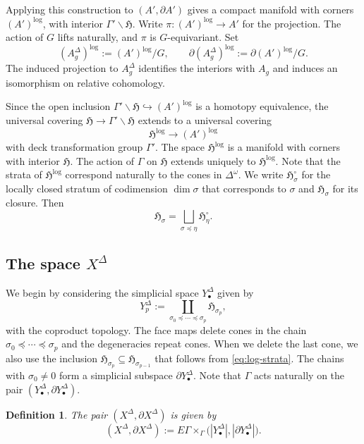 \documentclass[12 pt]{amsart}
\newcommand{\fH}{\mathfrak H}
\newcommand{\<}{\langle}
\renewcommand{\>}{\rangle}
\newtheorem{definition}[theorem]{Definition}
\theoremstyle{definition}
\begin{document}
Applying this construction to $(A',\partial A')$ gives a compact manifold with corners $(A')^{\log}$, with interior $\Gamma'\backslash\fH$. Write $\pi\colon(A')^{\log}\to A'$ for the projection. The action of $G$ lifts naturally, and $\pi$ is $G$-equivariant. Set
\[
(A_g^\Delta)^{\log}:=(A')^{\log}/G,
\qquad
\partial(A_g^\Delta)^{\log}:=\partial(A')^{\log}/G.
\]
The induced projection to $A_g^\Delta$ identifies the interiors with $A_g$ and induces an isomorphism on relative cohomology.

Since the open inclusion $\Gamma' \backslash \fH \hookrightarrow (A')^{\log}$ is a homotopy equivalence, the universal covering $\fH \to \Gamma' \backslash \fH$ extends to a universal covering
\[
\fH^{\log} \longrightarrow (A')^{\log}
\]
with deck transformation group $\Gamma'$. The space $\fH^{\log}$ is a manifold with corners with interior $\fH$. The action of $\Gamma$ on $\fH$ extends uniquely to $\fH^{\log}$.
Note that the strata of $\fH^{\log}$ correspond naturally to the cones in $\Delta^\omega$. We write $\fH_\sigma^\circ$ for the locally closed stratum of codimension $\dim \sigma$ that corresponds to $\sigma$ and $\fH_\sigma$ for its closure. Then 
\begin{equation} \label{eq:log-strata}
\fH_\sigma = \bigsqcup_{\sigma \preceq \eta} \fH_\eta^\circ.
\end{equation}

\subsection{The space \texorpdfstring{$X^\Delta$}{XDelta}}\label{sec:XgDelta}\label{sec:logarithmic-comparison}

We begin by considering the simplicial space $Y_\bullet^\Delta$ given by 
\[
Y_p^\Delta := \coprod_{\sigma_0 \preceq \cdots \preceq \sigma_p} \fH_{\sigma_p},
\]
with the coproduct topology. The face maps delete cones in the chain $\sigma_0 \preceq \cdots \preceq \sigma_p$ and the degeneracies repeat cones. When we delete the last cone, we also use the inclusion $\fH_{\sigma_p} \subseteq \fH_{\sigma_{p - 1}}$ that follows from \eqref{eq:log-strata}. The chains with $\sigma_0 \ne 0$ form a simplicial subspace $\partial Y_\bullet^\Delta$. Note that $\Gamma$ acts naturally on the pair $(Y_\bullet^\Delta, \partial Y_\bullet^\Delta)$.

\begin{definition}\label{def:XgDelta}
The pair $(X^\Delta, \partial X^\Delta)$ is given by
\[
(X^\Delta, \partial X^\Delta) := E \Gamma \times_\Gamma \bigl(|Y_\bullet^\Delta|, |\partial Y_\bullet^\Delta|\bigr).
\]
\end{definition}
\end{document}

